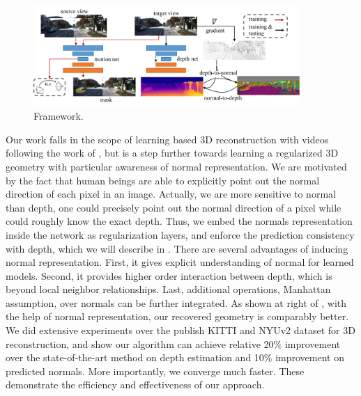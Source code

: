 \begin{figure}[t]
\centering
\includegraphics[width=0.9\textwidth]{figures/pipeline.pdf}
\caption{Framework.}
\label{fig:pipeline}
\end{figure}
Our work falls in the scope of learning based 3D reconstruction with videos following the work of \cite{zhou2017unsupervised}, but is a step further towards learning a regularized 3D geometry with particular awareness of normal representation. 
We are motivated by the fact that human beings are able to explicitly point out the normal direction of each pixel in an image. Actually, we are more sensitive to normal than depth, \eg one could precisely point out the normal direction of a pixel while could roughly know the exact depth. 
Thus, we embed the normals representation inside the network as regularization layers, and enforce the prediction consistency with depth, which we will describe in .
There are several advantages of inducing normal representation. First, it gives explicit understanding of normal for learned models.  Second, it provides higher order interaction between depth, which is beyond local neighbor relationships. Last, additional operations, \eg Manhattan assumption, over normals can be further integrated.
As shown at right of , with the help of normal representation, our recovered geometry is comparably better. We did extensive experiments over the publish KITTI and NYUv2 dataset for 3D reconstruction, and show our algorithm can achieve relative 20$\%$ improvement over the state-of-the-art method on depth estimation and 10$\%$ improvement on predicted normals. More importantly, we converge much faster. These demonstrate the efficiency and effectiveness of our approach.



